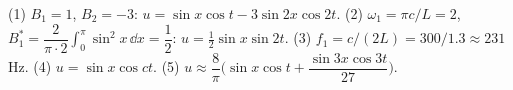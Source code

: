 \begin{answerbox}
(1) $B_1=1$, $B_2=-3$: $u = \sin x\cos t - 3\sin 2x\cos 2t$. \quad (2) $\omega_1 = \pi c/L = 2$, $B_1^* = \dfrac{2}{\pi\cdot 2}\displaystyle\int_0^\pi\sin^2x\,\dd x = \dfrac12$: $u = \tfrac12\sin x\sin 2t$. \quad (3) $f_1 = c/(2L) = 300/1.3 \approx 231$ Hz. \quad (4) $u = \sin x\cos ct$. \quad (5) $u\approx\dfrac8\pi\Big(\sin x\cos t + \dfrac{\sin 3x\cos 3t}{27}\Big)$.
\end{answerbox}
